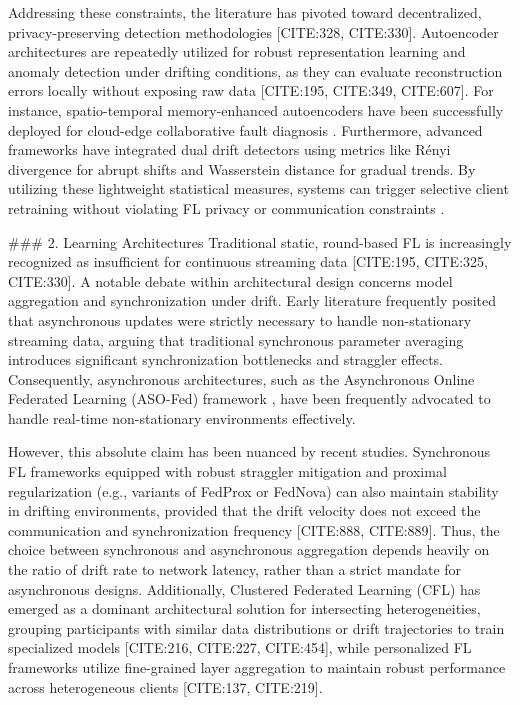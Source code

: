 \documentclass[journal]{IEEEtran}
\begin{document}
Addressing these constraints, the literature has pivoted toward decentralized, privacy-preserving detection methodologies [CITE:328, CITE:330]. Autoencoder architectures are repeatedly utilized for robust representation learning and anomaly detection under drifting conditions, as they can evaluate reconstruction errors locally without exposing raw data [CITE:195, CITE:349, CITE:607]. For instance, spatio-temporal memory-enhanced autoencoders have been successfully deployed for cloud-edge collaborative fault diagnosis \cite{Jiang2024}. Furthermore, advanced frameworks have integrated dual drift detectors using metrics like Rényi divergence for abrupt shifts and Wasserstein distance for gradual trends. By utilizing these lightweight statistical measures, systems can trigger selective client retraining without violating FL privacy or communication constraints \cite{Moayyed2025}.

\#\#\# 2. Learning Architectures
Traditional static, round-based FL is increasingly recognized as insufficient for continuous streaming data [CITE:195, CITE:325, CITE:330]. A notable debate within architectural design concerns model aggregation and synchronization under drift. Early literature frequently posited that asynchronous updates were strictly necessary to handle non-stationary streaming data, arguing that traditional synchronous parameter averaging introduces significant synchronization bottlenecks and straggler effects. Consequently, asynchronous architectures, such as the Asynchronous Online Federated Learning (ASO-Fed) framework \cite{Chen2020}, have been frequently advocated to handle real-time non-stationary environments effectively.

However, this absolute claim has been nuanced by recent studies. Synchronous FL frameworks equipped with robust straggler mitigation and proximal regularization (e.g., variants of FedProx or FedNova) can also maintain stability in drifting environments, provided that the drift velocity does not exceed the communication and synchronization frequency [CITE:888, CITE:889]. Thus, the choice between synchronous and asynchronous aggregation depends heavily on the ratio of drift rate to network latency, rather than a strict mandate for asynchronous designs. Additionally, Clustered Federated Learning (CFL) has emerged as a dominant architectural solution for intersecting heterogeneities, grouping participants with similar data distributions or drift trajectories to train specialized models [CITE:216, CITE:227, CITE:454], while personalized FL frameworks utilize fine-grained layer aggregation to maintain robust performance across heterogeneous clients [CITE:137, CITE:219].
\end{document}

